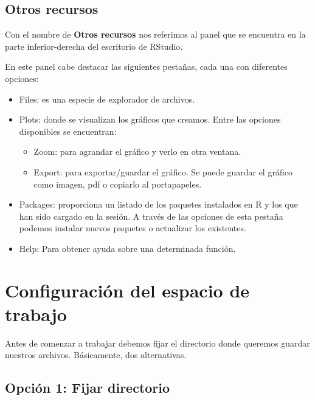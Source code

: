 \documentclass[
]{book}
\providecommand{\tightlist}{%
  \setlength{\itemsep}{0pt}\setlength{\parskip}{0pt}}
\begin{document}
\hypertarget{otros-recursos}{%
\subsection{Otros recursos}\label{otros-recursos}}

Con el nombre de \textbf{Otros recursos} nos referimos al panel que se encuentra en la parte inferior-derecha del escritorio de RStudio.

En este panel cabe destacar las siguientes pestañas, cada una con diferentes opciones:

\begin{itemize}
\item
  Files: es una especie de explorador de archivos.
\item
  Plots: donde se visualizan los gráficos que creamos. Entre las opciones disponibles se encuentran:

  \begin{itemize}
  \tightlist
  \item
    Zoom: para agrandar el gráfico y verlo en otra ventana.
  \item
    Export: para exportar/guardar el gráfico. Se puede guardar el gráfico como imagen, pdf o copiarlo al portapapeles.
  \end{itemize}
\item
  Packages: proporciona un listado de los paquetes instalados en R y los que han sido cargado en la sesión. A través de las opciones de esta pestaña podemos instalar nuevos paquetes o actualizar los existentes.
\item
  Help: Para obtener ayuda sobre una determinada función.
\end{itemize}

\hypertarget{configuraciuxf3n-del-espacio-de-trabajo}{%
\section{Configuración del espacio de trabajo}\label{configuraciuxf3n-del-espacio-de-trabajo}}

Antes de comenzar a trabajar debemos fijar el directorio donde queremos guardar nuestros archivos. Básicamente, dos alternativas.

\hypertarget{opciuxf3n-1-fijar-directorio}{%
\subsection{Opción 1: Fijar directorio}\label{opciuxf3n-1-fijar-directorio}}
\end{document}
